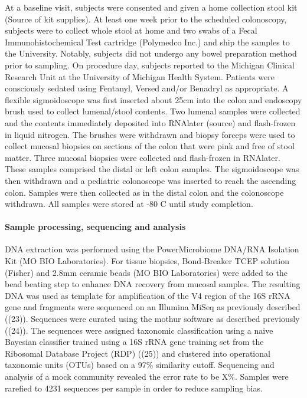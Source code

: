 \documentclass[11pt,]{article}
\let\oldparagraph\paragraph
\renewcommand{\paragraph}[1]{\oldparagraph{#1}\mbox{}}
\begin{document}
At a baseline visit, subjects were consented and given a home collection
stool kit (Source of kit supplies). At least one week prior to the
scheduled colonoscopy, subjects were to collect whole stool at home and
two swabs of a Fecal Immunohistochemical Test cartridge (Polymedco Inc.)
and ship the samples to the University. Notably, subjects did not
undergo any bowel preparation method prior to sampling. On procedure
day, subjects reported to the Michigan Clinical Research Unit at the
University of Michigan Health System. Patients were consciously sedated
using Fentanyl, Versed and/or Benadryl as appropriate. A flexible
sigmoidoscope was first inserted about 25cm into the colon and endoscopy
brush used to collect lumenal/stool contents. Two lumenal samples were
collected and the contents immediately deposited into RNAlater (source)
and flash-frozen in liquid nitrogen. The brushes were withdrawn and
biopsy forceps were used to collect mucosal biopsies on sections of the
colon that were pink and free of stool matter. Three mucosal biopsies
were collected and flash-frozen in RNAlater. These samples comprised the
distal or left colon samples. The sigmoidoscope was then withdrawn and a
pediatric colonoscope was inserted to reach the ascending colon. Samples
were then collected as in the distal colon and the colonoscope
withdrawn. All samples were stored at -80 C until study completion.

\paragraph{Sample processing, sequencing and
analysis}\label{sample-processing-sequencing-and-analysis}

DNA extraction was performed using the PowerMicrobiome DNA/RNA Isolation
Kit (MO BIO Laboratories). For tissue biopsies, Bond-Breaker TCEP
solution (Fisher) and 2.8mm ceramic beads (MO BIO Laboratories) were
added to the bead beating step to enhance DNA recovery from mucosal
samples. The resulting DNA was used as template for amplification of the
V4 region of the 16S rRNA gene and fragments were sequenced on an
Illumina MiSeq as previously described ((23)). Sequences were curated
using the mothur software as described previously ((24)). The sequences
were assigned taxonomic classification using a naive Bayesian classifier
trained using a 16S rRNA gene training set from the Ribosomal Database
Project (RDP) ((25)) and clustered into operational taxonomic units
(OTUs) based on a 97\% similarity cutoff. Sequencing and analysis of a
mock community revealed the error rate to be X\%. Samples were rarefied
to 4231 sequences per sample in order to reduce sampling bias.
\end{document}
